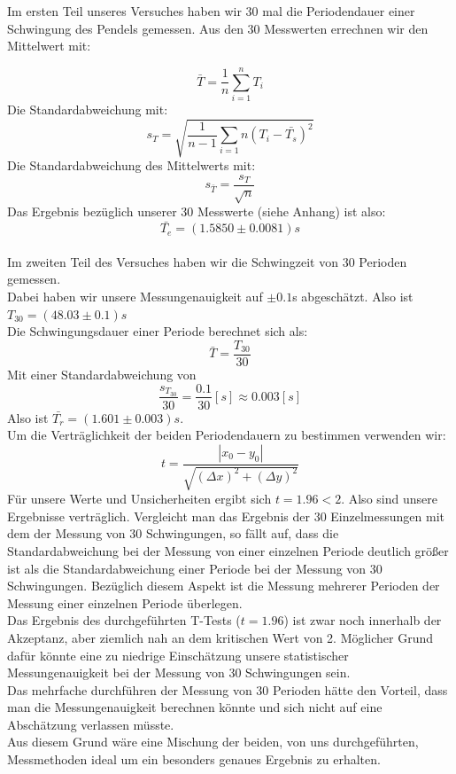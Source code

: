 \documentclass[11pt,a4paper]{article}
\begin{document}
	Im ersten Teil unseres Versuches haben wir 30 mal die Periodendauer einer Schwingung des Pendels
	gemessen. Aus den 30 Messwerten errechnen wir den Mittelwert mit:

	\begin{equation}
	\bar{T} = \frac{1}{n} \sum_{i=1}^{n} T_i
	\end{equation}
	Die Standardabweichung mit:
	\begin{equation}
	s_T=\sqrt{\frac{1}{n-1}\sum_{i=1}{n} (T_i - \bar{T_s})^2}
	\end{equation}
	Die Standardabweichung des Mittelwerts mit:
	\begin{equation}
	s_{\bar{T}}=\frac{s_T}{\sqrt{n}}
	\end{equation}
	Das Ergebnis bezüglich unserer 30 Messwerte (siehe Anhang) ist also:
	\begin{equation*}
	\bar{T_e}=(1.5850 \pm 0.0081)s
	\end{equation*}
	\\
	Im zweiten Teil des Versuches haben wir die Schwingzeit von 30 Perioden gemessen. \\
	Dabei haben wir unsere Messungenauigkeit auf $\pm 0.1$s abgeschätzt. Also ist $T_{30}=(48.03\pm 0.1)s$
	\\
	Die Schwingungsdauer einer Periode berechnet sich als:
	\begin{equation*}
	\bar{T}=\frac{T_{30}}{30}
	\end{equation*}
	Mit einer Standardabweichung von $$\frac{s_{T_{30}}}{30}=\frac{0.1}{30}[s]\approx 0.003[s]$$
	Also ist $\bar{T_r}=(1.601\pm 0.003)s$. \\
	Um die Verträglichkeit der beiden Periodendauern zu bestimmen verwenden wir:
	\begin{equation}
	t=\frac{ |x_0 -y_0|}{\sqrt{(\Delta x)^2 + (\Delta y)^2}}
	\end{equation}
	Für unsere Werte und Unsicherheiten ergibt sich $t=1.96<2$. Also sind unsere Ergebnisse verträglich.
	\newpage
	Vergleicht man das Ergebnis der 30 Einzelmessungen mit dem der Messung von 30 Schwingungen,
	so fällt auf, dass die Standardabweichung bei der Messung von einer einzelnen Periode deutlich
	größer ist als die Standardabweichung einer Periode bei der Messung von 30 Schwingungen.
	Bezüglich diesem Aspekt ist die Messung mehrerer Perioden der Messung einer einzelnen Periode überlegen.
	\\
	Das Ergebnis des durchgeführten T-Tests ($t=1.96$) ist zwar noch innerhalb der Akzeptanz, aber
	ziemlich nah an dem kritischen Wert von 2.
	Möglicher Grund dafür könnte eine zu niedrige Einschätzung unsere statistischer Messungenauigkeit bei der Messung von 30 Schwingungen sein.
	\\Das mehrfache durchführen der Messung von 30 Perioden hätte den Vorteil, dass man die Messungenauigkeit berechnen könnte und sich nicht auf eine Abschätzung verlassen müsste.
	\\
	Aus diesem Grund wäre eine Mischung der beiden, von uns durchgeführten, Messmethoden ideal um ein
	besonders genaues Ergebnis zu erhalten.
\end{document}
